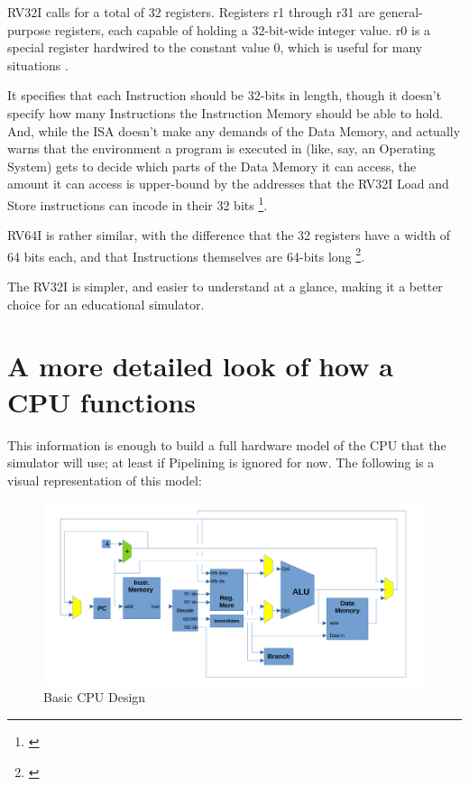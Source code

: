 \documentclass[12pt,twoside]{reedthesis}
\begin{document}
RV32I calls for a total of 32 registers. Registers r1 through r31 are general-purpose registers, each capable of holding a 32-bit-wide integer value. r0 is a special register hardwired to the constant value 0, which is useful for many situations .

It specifies that each Instruction should be 32-bits in length, though it doesn't specify how many Instructions the Instruction Memory should be able to hold. And, while the ISA doesn't make any demands of the Data Memory, and actually warns that the environment a program is executed in (like, say, an Operating System) gets to decide which parts of the Data Memory it can access, the amount it can access is upper-bound by the addresses that the RV32I Load and Store instructions can incode in their 32 bits \footnote{\cite{waterman}}.

RV64I is rather similar, with the difference that the 32 registers have a width of 64 bits each, and that Instructions themselves are 64-bits long \footnote{\cite{waterman}}.

The RV32I is simpler, and easier to understand at a glance, making it a better choice for an educational simulator.

\section{A more detailed look of how a CPU functions}

This information is enough to build a full hardware model of the CPU that the simulator will use; at least if Pipelining is ignored for now. The following is a visual representation of this model:

\begin{figure}[h!]

	\centering
	\includegraphics[scale=0.6]{cpu_basic}
	\caption{Basic CPU Design}
	\label{cpu-basic}
\end{figure}
\end{document}
